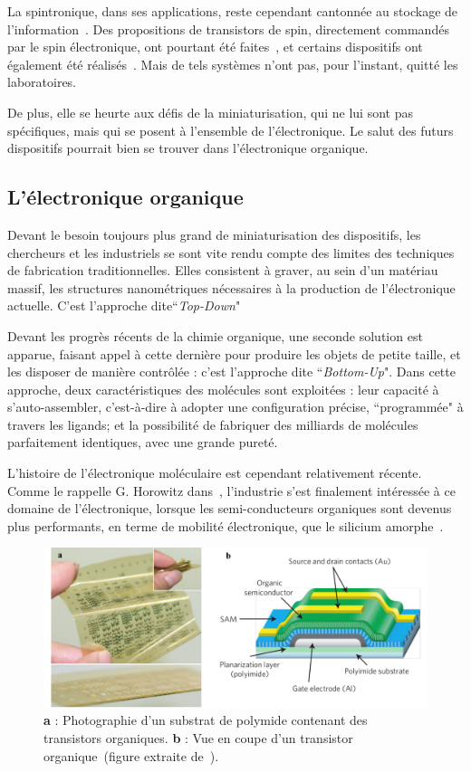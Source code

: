 La spintronique, dans ses applications, reste cependant cantonnée au stockage de  l'information~\cite{Awschalom2007}. Des propositions de transistors de spin, directement commandés par le spin électronique, ont pourtant été faites~\cite{Datta1990}, et certains dispositifs ont également été réalisés~\cite{Johnson1996,Huang2007}. Mais de tels systèmes n'ont pas, pour l'instant, quitté les laboratoires.

De plus, elle se heurte aux défis de la miniaturisation, qui ne lui sont pas spécifiques, mais qui se posent à l'ensemble de l'électronique. Le salut des futurs dispositifs pourrait bien se trouver dans l'électronique organique.

\subsection{L'électronique organique}
Devant le besoin toujours plus grand de miniaturisation des dispositifs, les chercheurs et les industriels se sont vite rendu compte des limites des techniques de fabrication traditionnelles. Elles consistent à graver, au sein d'un matériau massif, les structures nanométriques nécessaires à la production de l'électronique actuelle. C'est l'approche dite``\textit{Top-Down}"

Devant les progrès récents de la chimie organique, une seconde solution est apparue, faisant appel à cette dernière  pour produire les objets de petite taille, et les disposer de manière contrôlée : c'est l'approche dite ``\textit{Bottom-Up}". Dans cette approche, deux caractéristiques des molécules sont exploitées : leur capacité à s'auto-assembler, c'est-à-dire à adopter une configuration précise, ``programmée" à travers les ligands; et la possibilité de fabriquer des milliards de molécules parfaitement identiques, avec une grande pureté. 

L'histoire de l'électronique moléculaire est cependant relativement récente. Comme le rappelle G. Horowitz dans~\cite{Klauk2007}, l'industrie s'est finalement intéressée à ce domaine de l'électronique, lorsque les semi-conducteurs organiques sont devenus plus performants, en terme de mobilité électronique, que le silicium amorphe~\cite{Lin1997}.
\begin{figure}
\centering \includegraphics[scale=0.45]{Spintronique/MolecularElec/MolecularElec.pdf}
\caption{\textbf{a} : Photographie d'un substrat de polymide contenant des transistors organiques. \textbf{b} : Vue en coupe d'un transistor organique~(figure extraite de~\cite{Sekitani2010}).}
\label{MolecularElec}
\end{figure}


